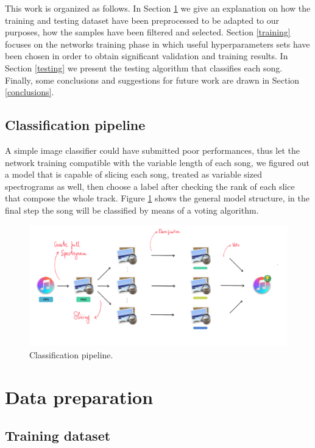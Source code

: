 \documentclass[10pt,twocolumn,letterpaper]{article}
\begin{document}
This work is organized as follows. In Section \ref{data-preparation} we give an explanation on how the training and testing dataset have been preprocessed to be adapted to our purposes, how the samples have been filtered and selected. Section \ref{training} focuses on the networks training phase in which useful hyperparameters sets have been chosen in order to obtain significant validation and training results. In Section \ref{testing} we present the testing algorithm that classifies each song. Finally, some conclusions and suggestions for future work are drawn in Section \ref{conclusions}.

\subsection{Classification pipeline}

A simple image classifier could have submitted poor performances, thus let the network training compatible with the variable length of each song, we figured out a model that is capable of slicing each song, treated as variable sized spectrograms as well, then choose a label after checking the rank of each slice that compose the whole track. Figure \ref{fig:pipeline} shows the general model structure, in the final step the song will be classified by means of a voting algorithm.

\begin{figure}
   \begin{center}
   \includegraphics[width=0.8\linewidth]{img/Pipeline-project}
   \end{center}
      \caption{Classification pipeline.}
   \label{fig:pipeline}
   \end{figure}

\section{Data preparation}\label{data-preparation}

\subsection{Training dataset}
\end{document}
